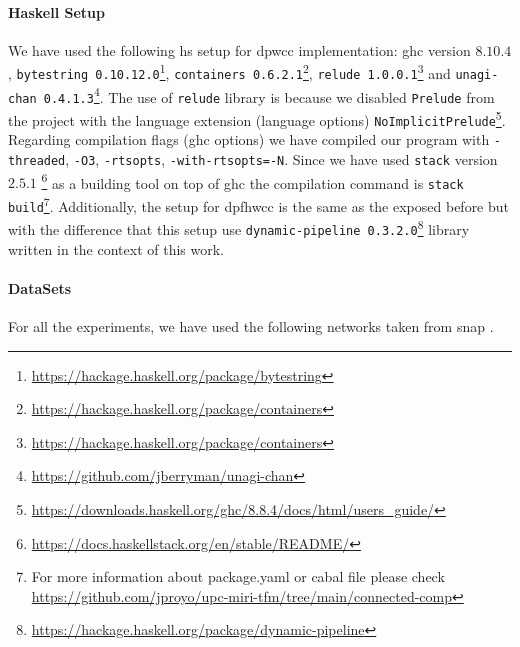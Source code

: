 \paragraph{Haskell Setup}
We have used the following \acrshort{hs} setup for \acrshort{dpwcc} implementation: \acrshort{ghc} version $8.10.4$, \texttt{bytestring 0.10.12.0}\footnote{\url{https://hackage.haskell.org/package/bytestring}}, \texttt{containers 0.6.2.1}\footnote{\url{https://hackage.haskell.org/package/containers}}, \texttt{relude 1.0.0.1}\footnote{\url{https://hackage.haskell.org/package/containers}} and \texttt{unagi-chan 0.4.1.3}\footnote{\url{https://github.com/jberryman/unagi-chan}}. 
The use of \texttt{relude} library is because we disabled \texttt{Prelude} from the project with the language extension (language options) \texttt{NoImplicitPrelude}\footnote{\url{https://downloads.haskell.org/ghc/8.8.4/docs/html/users_guide/}}. 
Regarding compilation flags (\acrshort{ghc} options) we have compiled our program with \texttt{-threaded}, \texttt{-O3}, \texttt{-rtsopts}, \texttt{-with-rtsopts=-N}. 
Since we have used \texttt{stack} version $2.5.1$ \footnote{\url{https://docs.haskellstack.org/en/stable/README/}} as a building tool on top of \acrshort{ghc} the compilation command is \texttt{stack build}\footnote{For more information about package.yaml or cabal file please check \url{https://github.com/jproyo/upc-miri-tfm/tree/main/connected-comp}}.
Additionally, the setup for \acrshort{dpfhwcc} is the same as the exposed before but with the difference that this setup use \texttt{dynamic-pipeline 0.3.2.0}\footnote{\url{https://hackage.haskell.org/package/dynamic-pipeline}} library written in the context of this work.


\paragraph{DataSets}\label{data:set}
For all the experiments, we have used the following networks taken from \acrshort{snap} \cite{stanford}. %

